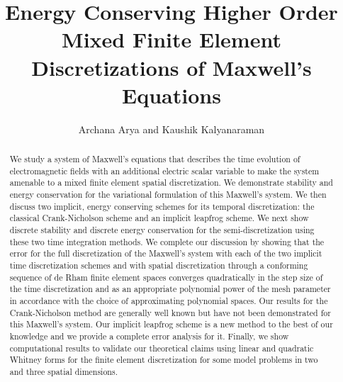 \documentclass{amsart}
\theoremstyle{thmstyleone}%
\theoremstyle{thmstyletwo}%
\theoremstyle{thmstylethree}%
\begin{document}
\title[Energy Conserving Discretizations of Maxwell's Equations]{Energy Conserving Higher Order Mixed Finite Element Discretizations of Maxwell's Equations}

\author{Archana Arya and Kaushik Kalyanaraman}
\address{Department of Mathematics, Indraprastha Institute of Information Technology, Delhi, New Delhi, 110020, India}

\begin{abstract}
We study a system of Maxwell's equations that describes the time evolution of electromagnetic fields with an additional electric scalar variable to make the system amenable to a mixed finite element spatial discretization. We demonstrate stability and energy conservation for the variational formulation of this Maxwell's system. We then discuss two implicit, energy conserving schemes for its temporal discretization: the classical Crank-Nicholson scheme and an implicit leapfrog scheme. We next show discrete stability and discrete energy conservation for the semi-discretization using these two time integration methods. We complete our discussion by showing that the error for the full discretization of the Maxwell's system with each of the two implicit time discretization schemes and with spatial discretization through a conforming sequence of de Rham finite element spaces converges quadratically in the step size of the time discretization and as an appropriate polynomial power of the mesh parameter in accordance with the choice of approximating polynomial spaces. Our results for the Crank-Nicholson method are generally well known but have not been demonstrated for this Maxwell's system. Our implicit leapfrog scheme is a new method to the best of our knowledge and we provide a complete error analysis for it. Finally, we show computational results to validate our theoretical claims using linear and quadratic Whitney forms for the finite element discretization for some model problems in two and three spatial dimensions.
\end{abstract}



\maketitle
\end{document}
